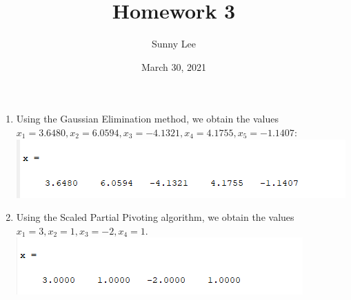 \documentclass{article}
\title{Homework 3}
\author{Sunny Lee}
\date{March 30, 2021}
\begin{document}
\begin{enumerate}
    \item Using the Gaussian Elimination method, we obtain the values $x_1 = 3.6480, 
    x_2 = 6.0594, x_3 = -4.1321, x_4 = 4.1755, x_5 = -1.1407$: \\
    \includegraphics{1.png}

    \item Using the Scaled Partial Pivoting algorithm, we obtain the values $x_1 = 3, 
    x_2 = 1, x_3 = -2, x_4 = 1$. \\
    \includegraphics{2.png}


\end{enumerate}
\end{document}
